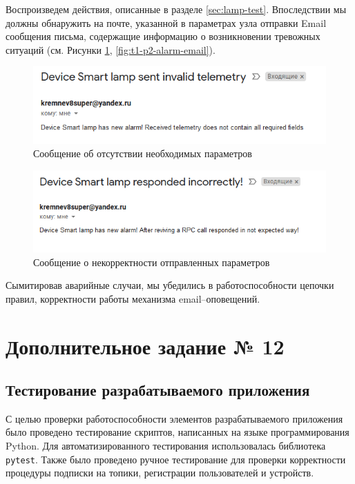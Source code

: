 \documentclass[a4paper,14pt]{extarticle}
\begin{document}
Воспроизведем действия, описанные в разделе \ref{sec:lamp-test}. Впоследствии мы должны обнаружить на почте, указанной в параметрах узла отправки Email сообщения письма, содержащие информацию о возникновении тревожных ситуаций (см. Рисунки \ref{fig:t2-p1-alarm-email}, \ref{fig:t1-p2-alarm-email}).
\begin{figure}[h!]
	\centering
	\includegraphics[width=0.8\linewidth]{images/t2-p1-alarm-email}
	\caption{Сообщение об отсутствии необходимых параметров}
	\label{fig:t2-p1-alarm-email}
\end{figure}

\begin{figure}[h!]
	\centering
	\includegraphics[width=0.76\linewidth]{images/t2-p2-alarm-email}
	\caption{Сообщение о некорректности отправленных параметров}
	\label{fig:t2-p2-alarm-email}
\end{figure}
\newpage
Сымитировав аварийные случаи, мы убедились в работоспособности цепочки правил, корректности работы механизма \mbox{email--оповещений}.  

\section{Дополнительное задание № 12}

\subsection{Тестирование разрабатываемого приложения}
С целью проверки работоспособности элементов разрабатываемого приложения было проведено тестирование скриптов, написанных на языке программирования Python. Для автоматизированного тестирования использовалась библиотека \texttt{pytest}. Также было проведено ручное тестирование для проверки корректности процедуры подписки на топики, регистрации пользователей и устройств. 
\end{document}
